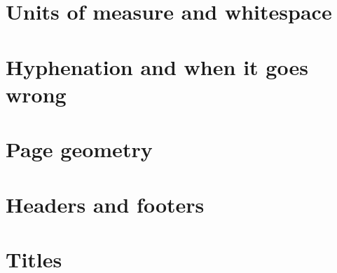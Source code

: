 
\section{Units of measure and whitespace}

\section{Hyphenation and when it goes wrong}

\section{Page geometry}


\section{Headers and footers}

\section{Titles}
